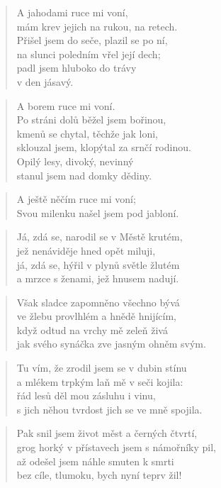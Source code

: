 \documentclass{book}
\begin{document}
\begin{verse}
A jahodami ruce mi voní,\\
mám krev jejich na rukou, na retech.\\
Přišel jsem do seče, plazil se po ní,\\
na slunci poledním vřel její dech;\\
padl jsem hluboko do trávy\\
v den jásavý.
\end{verse}
\begin{verse}
A borem ruce mi voní.\\
Po stráni dolů běžel jsem bořinou,\\
kmenů se chytal, těchže jak loni,\\
sklouzal jsem, klopýtal za srnčí rodinou.\\
Opilý lesy, divoký, nevinný\\
stanul jsem nad domky dědiny.
\end{verse}
\begin{verse}
A ještě něčím ruce mi voní;\\
Svou milenku našel jsem pod jabloní.
\end{verse}
\newpage
{}
\begin{verse}
Já, zdá se, narodil se v Městě krutém,\\
jež nenáviděje hned opět miluji,\\
já, zdá se, hýřil v plynů světle žlutém\\
a mrzce s ženami, jež hnusem nadují.
\end{verse}
\begin{verse}
Však sladce zapomněno všechno bývá\\
ve žlebu provlhlém a hnědě hnijícím,\\
když odtud na vrchy mě zeleň živá\\
jak svého synáčka zve jasným ohněm svým.
\end{verse}
\begin{verse}
Tu vím, že zrodil jsem se v dubin stínu\\
a mlékem trpkým laň mě v seči kojila:\\
řád lesů děl mou zásluhu i vinu,\\
s jich něhou tvrdost jich se ve mně spojila.
\end{verse}
\begin{verse}
Pak snil jsem život měst a černých čtvrtí,\\
grog horký v přístavech jsem s námořníky pil,\\
až odešel jsem náhle smuten k smrti\\
bez cíle, tlumoku, bych nyní teprv žil!
\end{verse}
\end{document}
